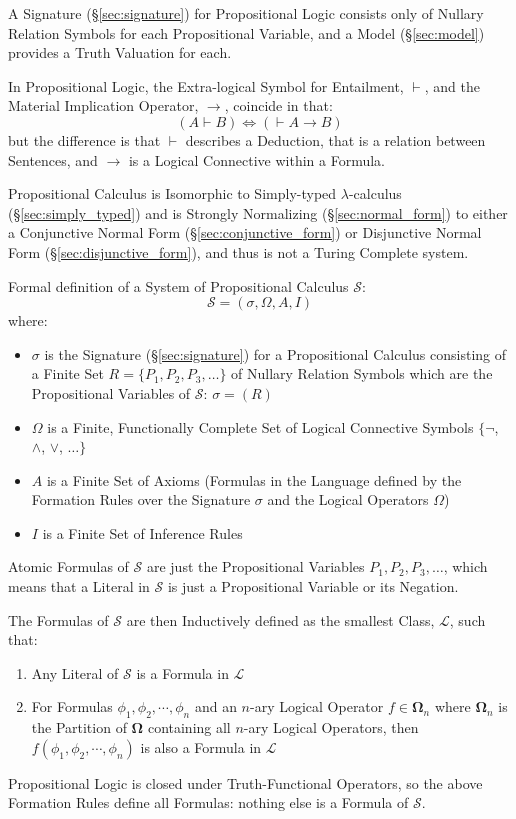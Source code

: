 A Signature (\S\ref{sec:signature}) for Propositional Logic consists
only of Nullary Relation Symbols for each Propositional Variable, and
a Model (\S\ref{sec:model}) provides a Truth Valuation for each.

In Propositional Logic, the Extra-logical Symbol for Entailment,
$\vdash$, and the Material Implication Operator, $\rightarrow$,
coincide in that:
\[(A \vdash B) \Leftrightarrow (\vdash A \rightarrow B)\]
but the difference is that $\vdash$ describes a Deduction, that is a
relation between Sentences, and $\rightarrow$ is a Logical Connective
within a Formula.

Propositional Calculus is Isomorphic to Simply-typed
$\lambda$-calculus (\S\ref{sec:simply_typed}) and is Strongly
Normalizing (\S\ref{sec:normal_form}) to either a Conjunctive Normal
Form (\S\ref{sec:conjunctive_form}) or Disjunctive Normal Form
(\S\ref{sec:disjunctive_form}), and thus is not a Turing Complete
system.

Formal definition of a System of Propositional Calculus $\mathcal{S}$:
\[
    \mathcal{S} = (\sigma, \Omega, A, I)
\]
where:
\begin{itemize}
\item $\sigma$ is the Signature (\S\ref{sec:signature}) for a
  Propositional Calculus consisting of a Finite Set $R = \{P_1, P_2,
  P_3, \ldots\}$ of Nullary Relation Symbols which are the
  Propositional Variables of $\mathcal{S}$: $\sigma = (R)$
\item $\Omega$ is a Finite, Functionally Complete Set of Logical
  Connective Symbols $\{\neg$, $\wedge$, $\vee$, $\ldots\}$
\item $A$ is a Finite Set of Axioms (Formulas in the Language defined
  by the Formation Rules over the Signature $\sigma$ and the Logical
  Operators $\Omega$)
\item $I$ is a Finite Set of Inference Rules
\end{itemize}
Atomic Formulas of $\mathcal{S}$ are just the Propositional Variables
$P_1, P_2, P_3, \ldots$, which means that a Literal in $\mathcal{S}$
is just a Propositional Variable or its Negation.

The Formulas of $\mathcal{S}$ are then Inductively defined as the
smallest Class, $\mathcal{L}$, such that:
\begin{enumerate}
\item Any Literal of $\mathcal{S}$ is a Formula in $\mathcal{L}$
\item For Formulas $\phi_1, \phi_2, \cdots, \phi_n$ and an $n$-ary
  Logical Operator $f \in \mathbf{\Omega}_n$ where $\mathbf{\Omega}_n$
  is the Partition of $\mathbf{\Omega}$ containing all $n$-ary Logical
  Operators, then $f(\phi_1, \phi_2, \cdots, \phi_n)$ is also a
  Formula in $\mathcal{L}$
\end{enumerate}
Propositional Logic is closed under Truth-Functional Operators, so the
above Formation Rules define all Formulas: nothing else is a Formula
of $\mathcal{S}$.


